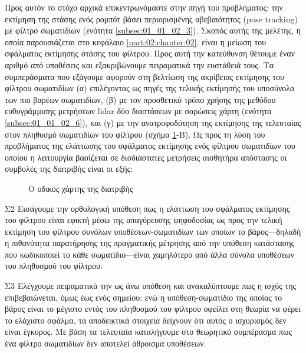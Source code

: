 Προς αυτόν το στόχο αρχικά επικεντρωνόμαστε στην πηγή του προβλήματος: την
εκτίμηση της στάσης ενός ρομπότ βάσει περιορισμένης αβεβαιότητος (pose
tracking) με φίλτρο σωματιδίων (ενότητα \ref{subsec:01_01_02_3}). Σκοπός αυτής
της μελέτης, η οποία παρουσιάζεται στο κεφάλαιο \ref{part:02:chapter:02}, είναι
η μείωση του σφάλματος εκτίμησης στάσης του φίλτρου. Προς αυτή την κατεύθυνση
θέτουμε έναν αριθμό από υποθέσεις και εξακριβώνουμε πειραματικά την ευστάθειά
τους. Τα συμπεράσματα που εξάγουμε αφορούν στη βελτίωση της ακρίβειας εκτίμησης
του φίλτρου σωματιδίων (α) επιλέγοντας ως πηγές της τελικής εκτίμησής του
υποσύνολα των πιο βαρέων σωματιδίων, (β) με τον προσθετικό τρόπο χρήσης της
μεθόδου ευθυγράμμισης μετρήσεων lidar δύο διαστάσεων με σαρώσεις χάρτη (ενότητα
\ref{subsec:01_01_02_6}), και (γ) με την ανατροφοδότηση της εκτίμησης της
τελευταίας στον πληθυσμό σωματιδίων του φίλτρου (σχήμα \ref{fig:roadmap}-Β). Ως
προς τη λύση του προβλήματος της ελάττωσης του σφάλματος εκτίμησης ενός φίλτρου
σωματιδίων του οποίου η λειτουργία βασίζεται σε δισδιάστατες μετρήσεις
αισθητήρα απόστασης οι συμβολές της διατριβής είναι οι εξής:


\begin{figure}\hspace{-2cm}
  
  \caption{\small Ο οδικός χάρτης της διατριβής}
  \label{fig:roadmap}
\end{figure}

\begin{bw_box}
\begin{customcontribution}{Σ2}
  \label{contribution:02}
  Εισάγουμε την ορθολογική υπόθεση πως η ελάττωση του σφάλματος εκτίμησης του
  φίλτρου είναι εφικτή μέσω της απαγόρευσης ψηφοδοσίας ως προς την τελική
  εκτίμηση του φίλτρου συνόλων υποθέσεων-σωματιδίων των οποίων το
  βάρος---δηλαδή η πιθανότητα παρατήρησης της πραγματικής μέτρησης από την
  υπόθεση κατάστασης που κωδικοποιεί το κάθε σωματίδιο---είναι χαμηλότερο από
  άλλα σύνολα υποθέσεων του πληθυσμού του φίλτρου. \cite{Filotheou2020c}
\end{customcontribution}
\end{bw_box}

\begin{bw_box}
\begin{customcontribution}{Σ3}
  \label{contribution:03}
  Ελέγχουμε πειραματικά την ως άνω υπόθεση και ανακαλύπτουμε πως η ισχύς της
  επιβεβαιώνεται, όμως έως ενός σημείου: ενώ η υπόθεση-σωματίδιο της οποίας το
  βάρος είναι το μέγιστο εντός του πληθυσμού του φίλτρου οφείλει στη θεωρία να
  φέρει το ελάχιστο σφάλμα, τα αποδεικτικά στοιχεία δείχνουν ότι αυτός ο
  ισχυρισμός δεν είναι έγκυρος. Με βάση τα τελευταία καταλήγουμε στο θεωρητικό
  συμπέρασμα πως ένα φίλτρο σωματιδίων δεν αποτελεί άθροισμα υποθέσεων.
\end{customcontribution}
\end{bw_box}

